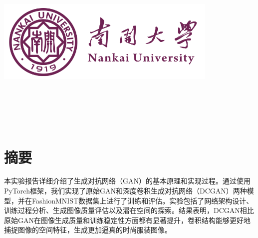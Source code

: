 \documentclass[UTF8]{ctexart}
\begin{document}
\renewcommand{\contentsname}{目\ 录}
\renewcommand{\appendixname}{附录}
\renewcommand{\appendixpagename}{附录}
\renewcommand{\refname}{参考文献} 
\renewcommand{\figurename}{图}
\renewcommand{\tablename}{表}
\renewcommand{\today}{\number\year 年 \number\month 月 \number\day 日}

\begin{titlepage}
    \begin{center}
    \includegraphics[width=0.8\textwidth]{NKU.png}\\[1cm]
    \vspace{20mm}
		\textbf{\huge\textbf{}}\\[0.5cm]
		\textbf{\Huge\textbf{}}

		\vspace{\fill}
    \centering
    \textsc{\LARGE {}}\\[0.5cm]
    \textsc{\LARGE {}}\\[0.5cm]
    \textsc{\LARGE {}}\\[0.5cm]
    \vfill
    {\Large }
    \end{center}
\end{titlepage}

\renewcommand {\thefigure}{\thesection{}.\arabic{figure}}%
\renewcommand{\figurename}{图}
\renewcommand{\contentsname}{目录}  

\clearpage
\tableofcontents
\newpage

\section*{摘要}
本实验报告详细介绍了生成对抗网络（GAN）的基本原理和实现过程。通过使用PyTorch框架，我们实现了原始GAN和深度卷积生成对抗网络（DCGAN）两种模型，并在FashionMNIST数据集上进行了训练和评估。实验包括了网络架构设计、训练过程分析、生成图像质量评估以及潜在空间的探索。结果表明，DCGAN相比原始GAN在图像生成质量和训练稳定性方面都有显著提升，卷积结构能够更好地捕捉图像的空间特征，生成更加逼真的时尚服装图像。
\end{document}

